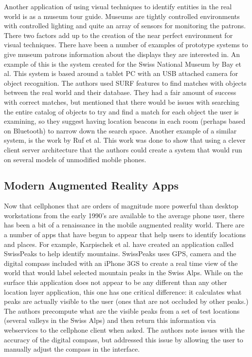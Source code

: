 \documentclass{acm_proc_article-sp}
\begin{document}
Another application of using visual techniques to identify entities in the real world is as a museum tour guide.  Museums are tightly controlled environments with controlled lighting and quite an array of sensors for monitoring the patrons. There two factors add up to the creation of the near perfect environment for visual techniques.   There have been a number of examples of prototype systems to give museum patrons information about the displays they are interested in.  An example of this is the system created for the Swiss National Museum by Bay et al.  This system is based around a tablet PC with an USB attached camera for object recognition.  The authors used SURF features to find matches with objects between the real world and their database.  They had a fair amount of success with correct matches, but mentioned that there would be issues with searching the entire catalog of objects to try and find a match for each object the user is examining, so they suggest having location beacons in each room (perhaps based on Bluetooth) to narrow down the search space. \cite{bay2006interactive}  Another example of a similar system, is the work by Ruf et al. \cite{ruf2010mobile}  This work was done to show that using a clever client server architecture that the authors could create a system that would run on several models of unmodified mobile phones.

\subsection{Modern Augmented Reality Apps}
Now that cellphones that are orders of magnitude more powerful than desktop workstations from the early 1990's are available to the average phone user, there has been a bit of a renaissance in the mobile augmented reality world.  
There are a number of apps that have begun to appear that help users to identify locations and places.  For example, Karpischek et al. have created an application called SwissPeaks to help identify mountains.  SwissPeaks uses GPS, camera and the digital compass included with an iPhone 3GS to create a real time view of the world that would label selected mountain peaks in the Swiss Alps.  While on the surface this application does not appear to be any different than any other location layer application, this one has one critical difference: it calculates what peaks are actually visible to the user (ones that are not occluded by other peaks.)  The authors precompute what are the visible peaks from a set of test locations (several valleys in the Swiss Alps) and then return this information via webservices to the cellphone client when asked.  The authors note issues with the accuracy of the digital compass, but addressed this issue by allowing the user to manually adjust the compass in the interface.  \cite{karpischek2009swisspeaks}
\end{document}
